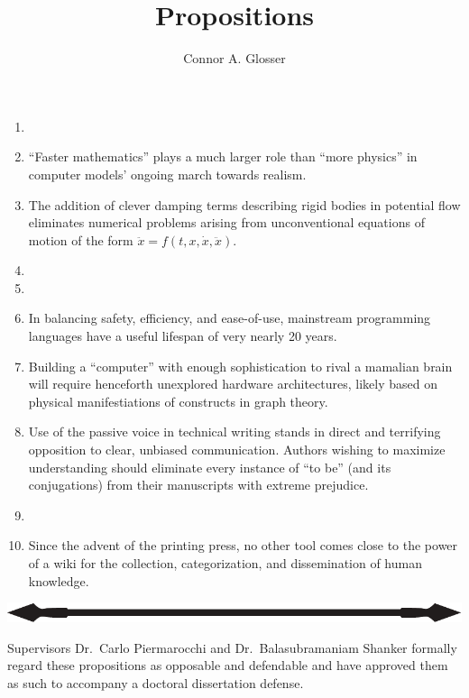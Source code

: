 \documentclass[]{tufte-book}
\title{Propositions}
\author{Connor A. Glosser}
\begin{document}
\maketitle

\begin{enumerate}

  \item
  \item ``Faster mathematics'' plays a much larger role than ``more physics'' in computer models' ongoing march towards realism.
  \item The addition of clever damping terms describing rigid bodies in potential flow eliminates numerical problems arising from unconventional equations of motion of the form $\ddot{x} = f(t, x, \dot{x}, \ddot{x})$.
  \item 
  \item
  \item In balancing safety, efficiency, and ease-of-use, mainstream programming languages have a useful lifespan of very nearly 20 years.
  \item Building a ``computer'' with enough sophistication to rival a mamalian brain will require henceforth unexplored hardware architectures, likely based on physical manifestiations of constructs in graph theory.
  \item Use of the passive voice in technical writing stands in direct and terrifying opposition to clear, unbiased communication. Authors wishing to maximize understanding should eliminate every instance of ``to be'' (and its conjugations) from their manuscripts with extreme prejudice.
  \item
  \item Since the advent of the printing press, no other tool comes close to the power of a wiki for the collection, categorization, and dissemination of human knowledge.

\end{enumerate}

\begin{center}
  \includegraphics[width=\textwidth]{spear_black.pdf}
\end{center}

\begin{center}
  Supervisors Dr.\ Carlo Piermarocchi and Dr.\ Balasubramaniam Shanker formally
  regard these propositions as opposable and defendable and have approved them
  as such to accompany a doctoral dissertation defense.
\end{center}
\end{document}
